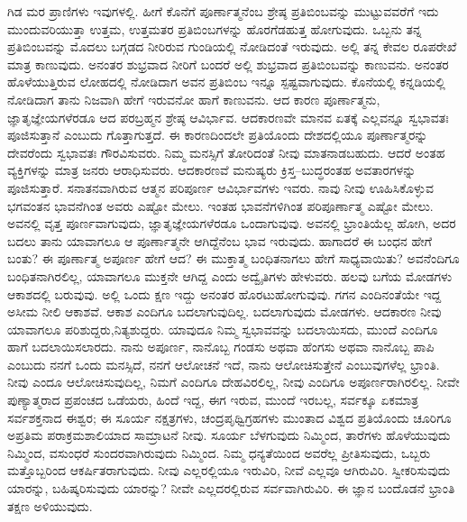 ಗಿಡ ಮರ ಪ್ರಾಣಿಗಳು ಇವುಗಳಲ್ಲಿ. ಹೀಗೆ ಕೊನೆಗೆ ಪೂರ್ಣಾತ್ಮನೆಂಬ ಶ್ರೇಷ್ಠ ಪ್ರತಿಬಿಂಬವನ್ನು ಮುಟ್ಟುವವರೆಗೆ ಇದು ಮುಂದುವರಿಯುತ್ತಾ ಉತ್ತಮ, ಉತ್ತಮತರ ಪ್ರತಿಬಿಂಬಗಳನ್ನು ಹೊರಗೆಡಹುತ್ತ ಹೋಗುವುದು. ಒಬ್ಬನು ತನ್ನ ಪ್ರತಿಬಿಂಬವನ್ನು ಮೊದಲು ಬಗ್ಗಡದ ನೀರಿರುವ ಗುಂಡಿಯಲ್ಲಿ ನೋಡಿದಂತೆ ಇರುವುದು. ಅಲ್ಲಿ ತನ್ನ ಕೇವಲ ರೂಪರೇಖೆ ಮಾತ್ರ ಕಾಣುವುದು. ಅನಂತರ ಶುಭ್ರವಾದ ನೀರಿಗೆ ಬಂದರೆ ಅಲ್ಲಿ ಶುಭ್ರವಾದ ಪ್ರತಿಬಿಂಬವನ್ನು ಕಾಣುವನು. ಅನಂತರ ಹೊಳೆಯುತ್ತಿರುವ ಲೋಹದಲ್ಲಿ ನೋಡಿದಾಗ ಅವನ ಪ್ರತಿಬಿಂಬ ಇನ್ನೂ ಸ್ಪಷ್ಟವಾಗುವುದು. ಕೊನೆಯಲ್ಲಿ ಕನ್ನಡಿಯಲ್ಲಿ ನೋಡಿದಾಗ ತಾನು ನಿಜವಾಗಿ ಹೇಗೆ ಇರುವನೋ ಹಾಗೆ ಕಾಣುವನು. ಆದ ಕಾರಣ ಪೂರ್ಣಾತ್ಮನು, ಜ್ಞಾತೃಜ್ಞೇಯಗಳೆರಡೂ ಆದ ಪರಬ್ರಹ್ಮನ ಶ್ರೇಷ್ಠ ಆವಿರ್ಭಾವ. ಆದಕಾರಣವೇ ಮಾನವ ಏತಕ್ಕೆ ಎಲ್ಲವನ್ನೂ ಸ್ವಭಾವತಃ ಪೂಜಿಸುತ್ತಾನೆ ಎಂಬುದು ಗೊತ್ತಾಗುತ್ತದೆ. ಈ ಕಾರಣದಿಂದಲೇ ಪ್ರತಿಯೊಂದು ದೇಶದಲ್ಲಿಯೂ ಪೂರ್ಣಾತ್ಮರನ್ನು ದೇವರೆಂದು ಸ್ವಭಾವತಃ ಗೌರವಿಸುವರು. ನಿಮ್ಮ ಮನಸ್ಸಿಗೆ ತೋರಿದಂತೆ ನೀವು ಮಾತನಾಡಬಹುದು. ಆದರೆ ಅಂತಹ ವ್ಯಕ್ತಿಗಳನ್ನು ಮಾತ್ರ ಜನರು ಆರಾಧಿಸುವರು. ಆದಕಾರಣವೆ ಮನುಷ್ಯರು ಕ್ರಿಸ್ತ–ಬುದ್ಧರಂತಹ ಅವತಾರಗಳನ್ನು ಪೂಜಿಸುತ್ತಾರೆ. ಸನಾತನವಾಗಿರುವ ಆತ್ಮನ ಪರಿಪೂರ್ಣ ಆವಿರ್ಭಾವಗಳು ಇವರು. ನಾವು ನೀವು ಊಹಿಸಿಕೊಳ್ಳುವ ಭಗವಂತನ ಭಾವನೆಗಿಂತ ಅವರು ಎಷ್ಟೋ ಮೇಲು. ಇಂತಹ ಭಾವನೆಗಳಿಗಿಂತ ಪರಿಪೂರ್ಣಾತ್ಮ ಎಷ್ಟೋ ಮೇಲು. ಅವನಲ್ಲಿ ವೃತ್ತ ಪೂರ್ಣವಾಗುವುದು, ಜ್ಞಾತೃಜ್ಞೇಯಗಳೆರಡೂ ಒಂದಾಗುವುವು. ಅವನಲ್ಲಿ ಭ್ರಾಂತಿಯೆಲ್ಲ ಹೋಗಿ, ಅದರ ಬದಲು ತಾನು ಯಾವಾಗಲೂ ಆ ಪೂರ್ಣಾತ್ಮನೇ ಆಗಿದ್ದೆನೆಂಬ ಭಾವ ಇರುವುದು. ಹಾಗಾದರೆ ಈ ಬಂಧನ ಹೇಗೆ ಬಂತು? ಈ ಪೂರ್ಣಾತ್ಮ ಅಪೂರ್ಣ ಹೇಗೆ ಆದ? ಈ ಮುಕ್ತಾತ್ಮ ಬಂಧಿತನಾಗಲು ಹೇಗೆ ಸಾಧ್ಯವಾಯಿತು? ಅವನೆಂದಿಗೂ ಬಂಧಿತನಾಗಿರಲಿಲ್ಲ, ಯಾವಾಗಲೂ ಮುಕ್ತನೇ ಆಗಿದ್ದ ಎಂದು ಅದ್ವೈತಿಗಳು ಹೇಳುವರು. ಹಲವು ಬಗೆಯ ಮೋಡಗಳು ಆಕಾಶದಲ್ಲಿ ಬರುವುವು. ಅಲ್ಲಿ ಒಂದು ಕ್ಷಣ ಇದ್ದು ಅನಂತರ ಹೊರಟುಹೋಗುವುವು. ಗಗನ ಎಂದಿನಂತೆಯೇ ಇದ್ದ ಅಸೀಮ ನೀಲಿ ಆಕಾಶವೆ. ಆಕಾಶ ಎಂದಿಗೂ ಬದಲಾಗುವುದಿಲ್ಲ. ಬದಲಾಗುವುದು ಮೋಡಗಳು. ಆದಕಾರಣ ನೀವು ಯಾವಾಗಲೂ ಪರಿಶುದ್ದರು,\break ನಿತ್ಯಶುದ್ದರು. ಯಾವುದೂ ನಿಮ್ಮ ಸ್ವಭಾವವನ್ನು ಬದಲಾಯಿಸದು, ಮುಂದೆ ಎಂದಿಗೂ ಹಾಗೆ ಬದಲಾಯಿಸಲಾರದು. ನಾನು ಅಪೂರ್ಣ, ನಾನೊಬ್ಬ ಗಂಡಸು ಅಥವಾ ಹೆಂಗಸು ಅಥವಾ ನಾನೊಬ್ಬ ಪಾಪಿ ಎಂಬುದು ನನಗೆ ಒಂದು ಮನಸ್ಸಿದೆ, ನನಗೆ ಆಲೋಚನೆ ಇದೆ, ನಾನು ಆಲೋಚಿಸುತ್ತೇನೆ ಎಂಬುವುಗಳೆಲ್ಲ ಭ್ರಾಂತಿ. ನೀವು ಎಂದೂ ಆಲೋಚಿಸುವುದಿಲ್ಲ, ನಿಮಗೆ ಎಂದಿಗೂ ದೇಹವಿರಲಿಲ್ಲ, ನೀವು ಎಂದಿಗೂ ಅಪೂರ್ಣರಾಗಿರಲಿಲ್ಲ. ನೀವೇ ಪುಣ್ಯಾತ್ಮರಾದ ಪ್ರಪಂಚದ ಒಡೆಯರು, ಹಿಂದೆ ಇದ್ದ, ಈಗ ಇರುವ, ಮುಂದೆ ಇರಬಲ್ಲ, ಸರ್ವಕ್ಕೂ ಏಕಮಾತ್ರ ಸರ್ವಶಕ್ತನಾದ ಈಶ್ವರ; ಈ ಸೂರ್ಯ ನಕ್ಷತ್ರಗಳು, ಚಂದ್ರಪೃಥ್ವಿಗ್ರಹಗಳು ಮುಂತಾದ ವಿಶ್ವದ ಪ್ರತಿಯೊಂದು ಚೂರಿಗೂ ಅಪ್ರತಿಮ ಪರಾಕ್ರಮಶಾಲಿಯಾದ ಸಾಮ್ರಾಟನೆ ನೀವು. ಸೂರ್ಯ ಬೆಳಗುವುದು ನಿಮ್ಮಿಂದ, ತಾರೆಗಳು ಹೊಳೆಯುವುದು ನಿಮ್ಮಿಂದ, ವಸುಂಧರೆ ಸುಂದರವಾಗಿರುವುದು ನಿಮ್ಮಿಂದ. ನಿಮ್ಮ ಧನ್ಯತೆಯಿಂದ ಅವರೆಲ್ಲ ಪ್ರೀತಿಸುವುದು, ಒಬ್ಬರು ಮತ್ತೊಬ್ಬರಿಂದ ಆಕರ್ಷಿತರಾಗುವುದು. ನೀವು ಎಲ್ಲರಲ್ಲಿಯೂ ಇರುವಿರಿ, ನೀವೆ ಎಲ್ಲವೂ ಆಗಿರುವಿರಿ. ಸ್ವೀಕರಿಸುವುದು ಯಾರನ್ನು, ಬಹಿಷ್ಕರಿಸುವುದು ಯಾರನ್ನು? ನೀವೇ ಎಲ್ಲದರಲ್ಲಿರುವ ಸರ್ವವಾಗಿರುವಿರಿ. ಈ ಜ್ಞಾನ ಬಂದೊಡನೆ ಭ್ರಾಂತಿ ತಕ್ಷಣ ಅಳಿಯುವುದು.

